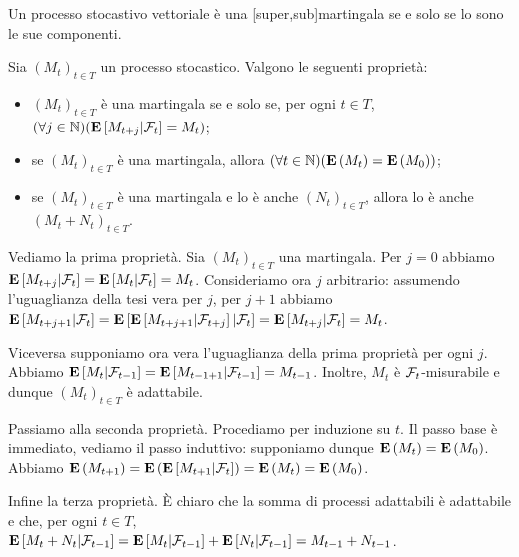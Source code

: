 \begin{Lemma}
	Un processo stocastivo vettoriale \`e una [super,sub]martingala se e solo se lo sono le sue componenti.
\end{Lemma}
\begin{Theorem}
	Sia $(M_t)_{t \in T}$ un processo stocastico. Valgono le seguenti propriet\`a:
	\begin{itemize}
		\item $(M_t)_{t \in T}$ \`e una martingala se e solo se, per ogni $t \in T$, $(\forall j \in \mathbb{N})(\mathbf{E} \left [M_{t + j}|\mathcal{F}_t \right ] = M_t)$;
		\item se $(M_t)_{t \in T}$ \`e una martingala, allora $(\forall t \in \mathbb{N})(\mathbf{E} \left ( M_t \right )=\mathbf{E} \left ( M_0 \right ))$;
		\item se $(M_t)_{t \in T}$ \`e una martingala e lo \`e anche $(N_t)_{t \in T}$, allora lo \`e anche $(M_t + N_t)_{t \in T}$.
	\end{itemize}
\end{Theorem}
\Proof Vediamo la prima propriet\`a. Sia $(M_t)_{t \in T}$ una martingala. Per $j = 0$ abbiamo $\mathbf{E} \left [M_{t + j}|\mathcal{F}_t \right ] = \mathbf{E} \left [M_t|\mathcal{F}_t \right ] = M_t$. Consideriamo ora $j$ arbitrario: assumendo l'uguaglianza della tesi vera per $j$, per $j + 1$ abbiamo $\mathbf{E} \left [M_{t + j + 1}|\mathcal{F}_t \right ] = \mathbf{E} \left [\mathbf{E} \left [M_{t + j + 1}|\mathcal{F}_{t + j} \right ]|\mathcal{F}_t \right ] = \mathbf{E} \left [M_{t + j}|\mathcal{F}_t \right ] = M_t$.
\par Viceversa supponiamo ora vera l'uguaglianza della prima propriet\`a per ogni $j$. Abbiamo $\mathbf{E} \left [M_t|\mathcal{F}_{t - 1} \right ] = \mathbf{E} \left [M_{t - 1 + 1}|\mathcal{F}_{t - 1} \right ] = M_{t - 1}$. Inoltre, $M_t$ \`e $\mathcal{F}_t$-misurabile e dunque $(M_t)_{t \in T}$ \`e adattabile.
\par Passiamo alla seconda propriet\`a. Procediamo per induzione su $t$. Il passo base \`e immediato, vediamo il passo induttivo: supponiamo dunque $\mathbf{E} \left ( M_t \right ) = \mathbf{E} \left ( M_0 \right )$. Abbiamo $\mathbf{E} \left ( M_{t + 1} \right ) = \mathbf{E} \left ( \mathbf{E} \left [M_{t + 1}|\mathcal{F}_t \right ] \right ) = \mathbf{E} \left ( M_t \right ) = \mathbf{E} \left ( M_0 \right )$.
\par Infine la terza propriet\`a. \`E chiaro che la somma di processi adattabili \`e adattabile e che, per ogni $t \in T$, $\mathbf{E} \left [M_t + N_t|\mathcal{F}_{t - 1} \right ] = \mathbf{E} \left [M_t|\mathcal{F}_{t - 1} \right ] + \mathbf{E} \left [N_t|\mathcal{F}_{t - 1} \right ] = M_{t - 1} + N_{t - 1}$. \EndProof
